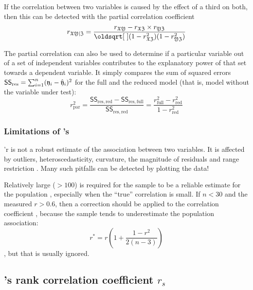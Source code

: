 \begin{refsection}
If the correlation between two variables  is caused by the effect of a third  on both, then this can be detected with the partial correlation coefficient
\begin{equation}
  r_{\AbsVec{XY}|\AbsVec{Z}} = \frac{r_{\AbsVec{XY}} - r_{\AbsVec{XZ}} \times r_{\AbsVec{YZ}}}{\sqrt{(1-r_\AbsVec{XZ}^2)(1-r_\AbsVec{YZ}^2)}}
\end{equation}

The partial correlation can also be used to determine if a particular variable out of a set of independent variables contributes to the explanatory power of that set towards a dependent variable. It simply compares the sum of squared errors \(\mathsf{SS}_\mathrm{res} = \sum_{i=1}^{n}(\mathfrak{y}_i - \hat{\mathfrak{y}}_i)^2 \) for the full and the reduced model (that is, model without the variable under test):
\begin{equation}
  r^2_\mathrm{par} = \frac{\mathsf{SS}_\mathrm{res, red} - \mathsf{SS}_\mathrm{res, full}}{\mathsf{SS}_\mathrm{res, red}} = \frac{r^2_\mathrm{full} - r^2_\mathrm{red}}{1 - r^2_\mathrm{red}}
\end{equation}

\subsubsection{Limitations of 's }

'r  is not a robust estimate of the association between two variables. It is affected by outliers, heteroscedasticity, curvature, the magnitude of residuals and range restriction \parencite[fig. 2]{Per-13}. Many such pitfalls can be detected by plotting the data!

Relatively large  (\( > 100 \)) is required for the sample  to be a reliable estimate for the population , especially when the ``true'' correlation is small. If \(n < 30 \) and the measured \(r > 0.6 \), then a correction should be applied to the correlation coefficient \parencite{Olk-58}, because the sample  tends to underestimate the population association:
\begin{equation}
  r^* = r \left(1 + \frac{1 - r^2}{2 (n-3)}\right)
\end{equation}
, but that is usually ignored.



\subsection{'s rank correlation coefficient \(r_s \)}


\end{refsection}

